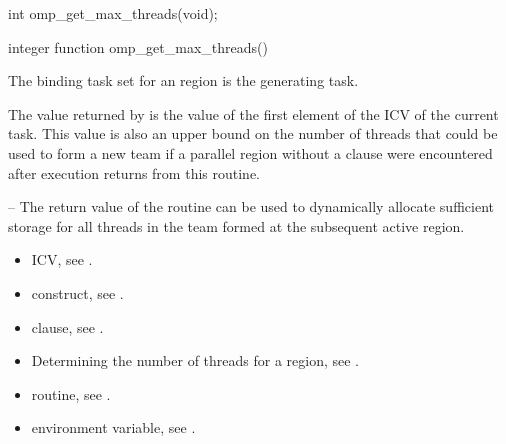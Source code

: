 \pagebreak
\format
\ccppspecificstart
\begin{boxedcode}
int omp\_get\_max\_threads(void);
\end{boxedcode}
\ccppspecificend

\fortranspecificstart
\begin{boxedcode}
integer function omp\_get\_max\_threads()
\end{boxedcode}
\fortranspecificend

\binding
The binding task set for an  region is the generating task. 

\effect
The value returned by  is the value of the first element of 
the  ICV of the current task. This value is also an upper bound on the 
number of threads that could be used to form a new team if a parallel region without a 
 clause were encountered after execution returns from this routine.

\notestart
\noteheader – The return value of the  routine can be used to 
dynamically allocate sufficient storage for all threads in the team formed at the 
subsequent active  region.
\noteend

\crossreferences
\begin{itemize}
\item {} ICV, see 
.

\item {} construct, see 
.

\item {} clause, see 
.

\item Determining the number of threads for a  region, see
. 

\item {} routine, see 
.

\item {} environment variable, see 
.
\end{itemize}










